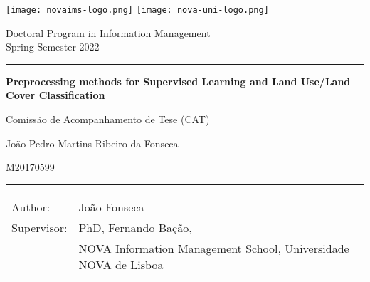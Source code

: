 \thispagestyle{empty}
\begin{titlepage}
	\texttt{[image: novaims-logo.png]}
	\hfill
	\texttt{[image: nova-uni-logo.png]}

    \vspace{.3cm}

	\noindent\begin{small} \sffamily
		\begin{minipage}{0.65\textwidth}
			Doctoral Program in Information Management\\
			Spring Semester 2022\\
		\end{minipage}
	\hrule
	\end{small}

	\vspace{1cm}
    {\LARGE\noindent \textbf{Preprocessing methods for Supervised Learning and
        Land Use/Land Cover Classification
    } \par}
	\vspace{0.5cm}
    {\Large\noindent Comissão de Acompanhamento de Tese (CAT) \par}
	\vspace{5cm}
	{\LARGE\noindent João Pedro Martins Ribeiro da Fonseca \par}
	{\Large\noindent M20170599 \par}

	\vfill
		
	\hrule
	\vspace{0.3cm}
	
	
	\begin{table}[h!]
		\begin{small} \sffamily
			\begin{tabular}{p{}p{}}
				Author:         & João Fonseca \\
				Supervisor:     & PhD, Fernando Bação, \\
				                & NOVA Information Management School, 
                                  Universidade NOVA de Lisboa \\
			\end{tabular}
		\end{small}
	\end{table}
	
\end{titlepage}
